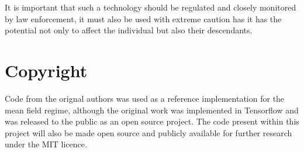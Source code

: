 It is important that such a technology should be regulated
and closely monitored by law enforcement, it must
also be used with extreme caution has it has
the potential not only to affect the individual
but also their descendants.

\section{Copyright}
Code from the orignal authors
\cite{Yang2018} was used as a reference
implementation for the mean field regime,
although the original work was implemented in Tensorflow
and was released to the public as an open source project.
The code present within this project will also be
made open source and publicly available for further 
research under the MIT licence.